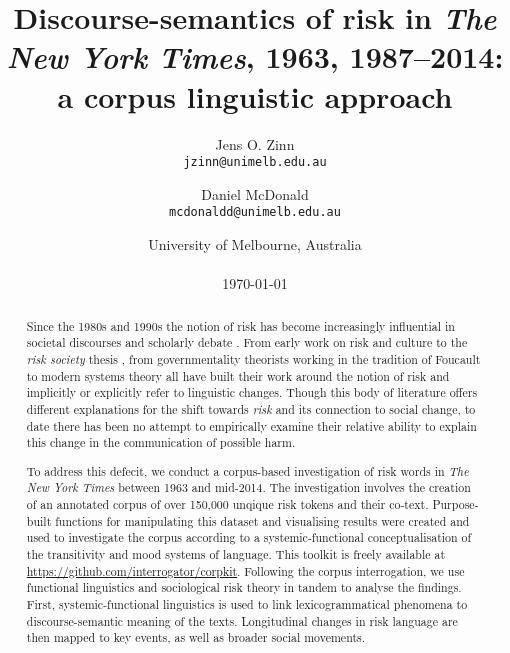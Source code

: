 \documentclass{report}
\title{Discourse-semantics of risk in \emph{The New York Times}, 1963, 1987--2014: a corpus linguistic approach}
\author{
Jens O. Zinn\\
\texttt{jzinn@unimelb.edu.au}
\and
Daniel McDonald\\
\texttt{mcdonaldd@unimelb.edu.au}\\
}
\date{University of Melbourne, Australia\\
~\\
\today}
\begin{document}

\renewcommand{\abstractname}{Abstract}

\maketitle

\begin{abstract}
\noindent Since the 1980s and 1990s the notion of risk has become increasingly influential in societal discourses and scholarly debate \cite{skolbekken_risk_1995}. From early work on risk and culture \cite{douglas_risk_1986,douglas_risk_2013} to the \emph{risk society} thesis \cite{beck_risk_1992,beck_world_2009,giddens_runaway_2002}, from governmentality theorists working in the tradition of Foucault \cite{dean_governmentality:_2010,omalley_risk_2012,rose_powers_1999} to modern systems theory \cite{luhmann_risk:_1993} all have built their work around the notion of risk and implicitly or explicitly refer to linguistic changes. Though this body of literature offers different explanations for the shift towards \emph{risk} and its connection to social change, to date there has been no attempt to empirically examine their relative ability to explain this change in the communication of possible harm. 


To address this defecit, we conduct a corpus-based investigation of risk words in \emph{The New York Times} between 1963 and mid-2014. The investigation involves the creation of an annotated corpus of over 150,000 unqique risk tokens and their co-text. Purpose-built functions for manipulating this dataset and visualising results were created and used to investigate the corpus according to a systemic-functional conceptualisation of the transitivity and mood systems of language. This toolkit is freely available at \url{https://github.com/interrogator/corpkit}. Following the corpus interrogation, we use functional linguistics and sociological risk theory in tandem to analyse the findings. First, systemic-functional linguistics is used to link lexicogrammatical phenomena to discourse-semantic meaning of the texts. Longitudinal changes in risk language are then mapped to key events, as well as broader social movements.


\end{abstract}
\end{document}
